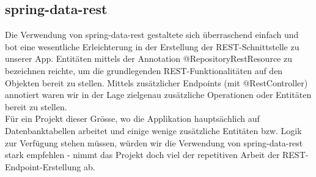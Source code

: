 \documentclass[11pt]{article} %
\begin{document}
\subsection{spring-data-rest}
Die Verwendung von spring-data-rest gestaltete sich überraschend einfach und bot eine wesentliche Erleichterung in der Erstellung der REST-Schnittstelle zu unserer App. Entitäten mittels der Annotation @RepositoryRestResource zu bezeichnen reichte, um die grundlegenden REST-Funktionalitäten auf den Objekten bereit zu stellen. Mittels zusätzlicher Endpoints (mit @RestController) annotiert waren wir in der Lage zielgenau zusätzliche Operationen oder Entitäten bereit zu stellen.
\\
Für ein Projekt dieser Grösse, wo die Applikation hauptsächlich auf Datenbanktabellen arbeitet und einige wenige zusätzliche Entitäten bzw. Logik zur Verfügung stehen müssen, würden wir die Verwendung von spring-data-rest stark empfehlen - nimmt das Projekt doch viel der repetitiven Arbeit der REST-Endpoint-Erstellung ab.
\end{document}
